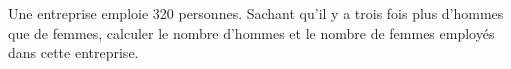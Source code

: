Une entreprise emploie 320 personnes. 
Sachant qu'il y a trois fois plus d'hommes que de femmes, calculer le nombre d'hommes et le nombre de femmes employés dans cette entreprise.